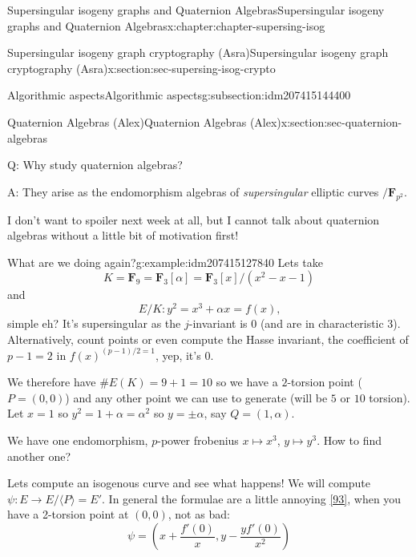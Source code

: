 \documentclass[oneside,10pt,]{book}
\numberwithin{equation}{section}
\newcommand{\FF}{\mathbf{F}}
\begin{document}
\begin{chapterptx}{Supersingular isogeny graphs and Quaternion Algebras}{}{Supersingular isogeny graphs and Quaternion Algebras}{}{}{x:chapter:chapter-supersing-isog}
\begin{sectionptx}{Supersingular isogeny graph cryptography (Asra)}{}{Supersingular isogeny graph cryptography (Asra)}{}{}{x:section:sec-supersing-isog-crypto}
\begin{subsectionptx}{Algorithmic aspects}{}{Algorithmic aspects}{}{}{g:subsection:idm207415144400}
\begin{enumerate}
\end{enumerate}
%
\end{subsectionptx}
\end{sectionptx}
%
%
\typeout{************************************************}
\typeout{************************************************}
%
\begin{sectionptx}{Quaternion Algebras (Alex)}{}{Quaternion Algebras (Alex)}{}{}{x:section:sec-quaternion-algebras}
\begin{introduction}{}%
Q: Why study quaternion algebras?%
\par
A: They arise as the endomorphism algebras of \emph{supersingular} elliptic curves \(/\FF_{p^2}\).%
\par
I don't want to spoiler next week at all, but I cannot talk about quaternion algebras without a little bit of motivation first!%
\begin{example}{What are we doing again?}{g:example:idm207415127840}%
Lets take%
\begin{equation*}
K = \FF_9 = \FF_3[\alpha] = \FF_3[x]/(x^2- x - 1)
\end{equation*}
and%
\begin{equation*}
E/K\colon y^2 = x^3 + \alpha x = f(x)\text{,}
\end{equation*}
simple eh? It's supersingular as the \(j\)-invariant is 0 (and are in characteristic 3). Alternatively, count points or even compute the Hasse invariant, the coefficient of \(p -1 = 2\) in \(f(x)^{(p-1)/2 = 1}\), yep, it's 0.%
\par
We therefore have \(\#E(K) = 9 + 1 = 10\) so we have a \(2\)-torsion point (\(P = (0,0)\)) and any other point we can use to generate (will be \(5\) or \(10\) torsion). Let \(x = 1\) so \(y^2 = 1 + \alpha = \alpha^2\) so \(y = \pm\alpha\), say \(Q = (1,\alpha)\).%
\par
We have one endomorphism, \(p\)-power frobenius \(x\mapsto x^3\), \(y\mapsto y^3\). How to find another one?%
\par
Lets compute an isogenous curve and see what happens! We will compute \(\psi\colon  E \to E/\langle P \rangle = E'\). In general the formulae are  a little annoying \hyperlink{x:biblio:bib-velu}{[93]}, when you have a 2-torsion point at \((0,0)\), not as bad:%
\begin{equation*}
\psi = \left(x + \frac{f'(0)}{x}, y - \frac{yf'(0)}{x^2} \right)
\end{equation*}
%
\begin{equation*}

\end{equation*}
\end{example}
\end{introduction}
\end{sectionptx}
\end{chapterptx}
\end{document}
